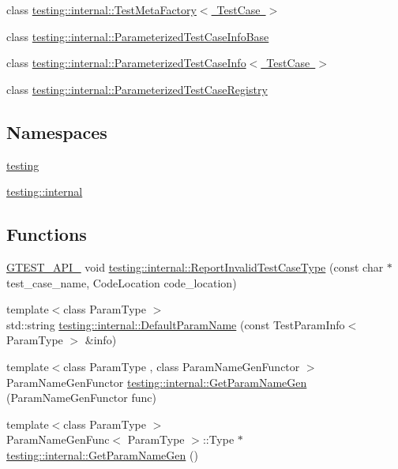 \begin{DoxyCompactItemize}
class \mbox{\hyperlink{classtesting_1_1internal_1_1TestMetaFactory}{testing\+::internal\+::\+Test\+Meta\+Factory$<$ Test\+Case $>$}}
\item 
class \mbox{\hyperlink{classtesting_1_1internal_1_1ParameterizedTestCaseInfoBase}{testing\+::internal\+::\+Parameterized\+Test\+Case\+Info\+Base}}
\item 
class \mbox{\hyperlink{classtesting_1_1internal_1_1ParameterizedTestCaseInfo}{testing\+::internal\+::\+Parameterized\+Test\+Case\+Info$<$ Test\+Case $>$}}
\item 
class \mbox{\hyperlink{classtesting_1_1internal_1_1ParameterizedTestCaseRegistry}{testing\+::internal\+::\+Parameterized\+Test\+Case\+Registry}}
\end{DoxyCompactItemize}
\subsection*{Namespaces}
\begin{DoxyCompactItemize}
\item 
 \mbox{\hyperlink{namespacetesting}{testing}}
\item 
 \mbox{\hyperlink{namespacetesting_1_1internal}{testing\+::internal}}
\end{DoxyCompactItemize}
\subsection*{Functions}
\begin{DoxyCompactItemize}
\item 
\mbox{\hyperlink{gtest-port_8h_aa73be6f0ba4a7456180a94904ce17790}{G\+T\+E\+S\+T\+\_\+\+A\+P\+I\+\_\+}} void \mbox{\hyperlink{namespacetesting_1_1internal_ab7e343160ee0aca7c8ae7c025a372453}{testing\+::internal\+::\+Report\+Invalid\+Test\+Case\+Type}} (const char $\ast$test\+\_\+case\+\_\+name, Code\+Location code\+\_\+location)
\item 
{\footnotesize template$<$class Param\+Type $>$ }\\std\+::string \mbox{\hyperlink{namespacetesting_1_1internal_a954ec4a8a932dac7743e77e459ffefdc}{testing\+::internal\+::\+Default\+Param\+Name}} (const Test\+Param\+Info$<$ Param\+Type $>$ \&info)
\item 
{\footnotesize template$<$class Param\+Type , class Param\+Name\+Gen\+Functor $>$ }\\Param\+Name\+Gen\+Functor \mbox{\hyperlink{namespacetesting_1_1internal_abc0f0626877188afba6ad122d502f088}{testing\+::internal\+::\+Get\+Param\+Name\+Gen}} (Param\+Name\+Gen\+Functor func)
\item 
{\footnotesize template$<$class Param\+Type $>$ }\\Param\+Name\+Gen\+Func$<$ Param\+Type $>$\+::Type $\ast$ \mbox{\hyperlink{namespacetesting_1_1internal_a27d6ea7d401e877cb0fbddf4206ebbe4}{testing\+::internal\+::\+Get\+Param\+Name\+Gen}} ()
\end{DoxyCompactItemize}
